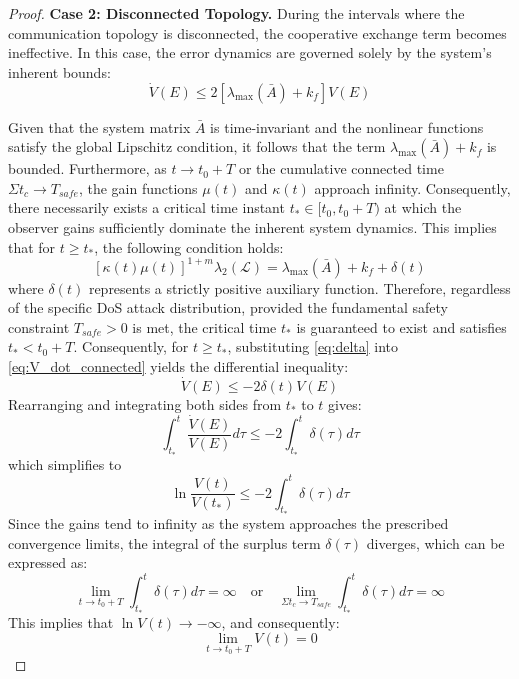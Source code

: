 \documentclass[lettersize,journal]{IEEEtran}
\newtheorem{proof}{Proof}
\begin{document}
\begin{proof}
	\textbf{Case 2: Disconnected Topology.} During the intervals where the communication topology is disconnected, the cooperative exchange term becomes ineffective. In this case, the error dynamics are governed solely by the system's inherent bounds:
	\begin{equation}
		\label{eq:V_dot_disconnected}
		\dot{V}(E) \le 2 \left[ \lambda_{\max}(\bar{A}) + k_f \right] V(E)
	\end{equation}
	
Given that the system matrix $\bar{A}$ is time-invariant and the nonlinear functions satisfy the global Lipschitz condition, it follows that the term $\lambda_{\max}(\bar{A}) + k_f$ is bounded. Furthermore, as $t \to t_0 + T$ or the cumulative connected time $\Sigma t_c \to T_{safe}$, the gain functions $\mu(t)$ and $\kappa(t)$ approach infinity. Consequently, there necessarily exists a critical time instant $t_* \in [t_0, t_0 + T)$ at which the observer gains sufficiently dominate the inherent system dynamics. This implies that for $t \ge t_*$, the following condition holds:
\begin{equation}
	\label{eq:delta}
	[\kappa(t)\mu(t)]^{1+m} \lambda_2(\mathcal{L}) = \lambda_{\max}(\bar{A}) + k_f + \delta(t)
\end{equation}
where $\delta(t)$ represents a strictly positive auxiliary function. Therefore, regardless of the specific DoS attack distribution, provided the fundamental safety constraint $T_{safe} > 0$ is met, the critical time $t_*$ is guaranteed to exist and satisfies $t_* < t_0 + T$. Consequently, for $t \ge t_*$, substituting \eqref{eq:delta} into \eqref{eq:V_dot_connected} yields the differential inequality:
\begin{equation}
	\dot{V}(E) \le -2\delta(t) V(E)
\end{equation}
Rearranging and integrating both sides from $t_*$ to $t$ gives:
\begin{equation}
	\int_{t_*}^t \frac{\dot{V}(E)}{V(E)} d\tau \le -2 \int_{t_*}^t \delta(\tau) d\tau
\end{equation}
which simplifies to
\begin{equation}
	\ln \frac{V(t)}{V(t_*)} \le -2 \int_{t_*}^t \delta(\tau) d\tau
\end{equation}
Since the gains tend to infinity as the system approaches the prescribed convergence limits, the integral of the surplus term $\delta(\tau)$ diverges, which can be expressed as:
\begin{equation}
	\lim_{t \to t_0 + T} \int_{t_*}^t \delta(\tau) d\tau = \infty \quad \text{or} \quad \lim_{\Sigma t_c \to T_{safe}} \int_{t_*}^t \delta(\tau) d\tau = \infty
\end{equation}
This implies that $\ln V(t) \to -\infty$, and consequently:
\begin{equation}
	\lim_{t \to t_0 + T} V(t) = 0
\end{equation}


\end{proof}
\end{document}
